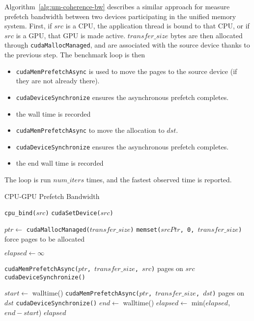 Algorithm~\ref{alg:um-coherence-bw} describes a similar approach for measure prefetch bandwidth between two devices participating in the unified memory system.
First, if $src$ is a CPU, the application thread is bound to that CPU, or if $src$ is a GPU, that GPU is made active.
$transfer\_size$ bytes are then allocated through \texttt{cudaMallocManaged}, and are associated with the source device thanks to the previous step.
The benchmark loop is then
\begin{itemize}
	\item \texttt{cudaMemPrefetchAsync} is used to move the pages to the source device (if they are not already there).
	\item \texttt{cudaDeviceSynchronize} ensures the asynchronous prefetch completes.
	\item the wall time is recorded
	\item \texttt{cudaMemPrefetchAsync} to move the allocation to $dst$.
	\item \texttt{cudaDeviceSynchronize} ensures the asynchronous prefetch completes.
	\item the end wall time is recorded
\end{itemize}
The loop is run $num\_iters$ times, and the fastest observed time is reported.

\begin{algorithm}
	\caption{CPU-GPU Prefetch Bandwidth}
	\label{alg:um-prefetch-bw}
	\begin{algorithmic}[1]
		\Statex
				
		\State \texttt{cpu\_bind($src$)}
		\Else
		\State \texttt{cudaSetDevice($src$)}
		\EndIf
				
		\State $ptr \gets$ \texttt{cudaMallocManaged($transfer\_size$)}
		\State \texttt{memset($srcPtr$, 0, $transfer\_size$)} \Comment force pages to be allocated
				
		\State $elapsed \gets \infty$
				
		\State \texttt{cudaMemPrefetchAsync($ptr$, $transfer\_size$, $src$)} \Comment pages on $src$
		\State \texttt{cudaDeviceSynchronize()}
				
		\State $start \gets$ walltime()
		\State \texttt{cudaMemPrefetchAsync($ptr$, $transfer\_size$, $dst$)} \Comment pages on $dst$
		\State \texttt{cudaDeviceSynchronize()}
		\State $end \gets$ walltime()
		\State $elapsed \gets$ min($elapsed$, $end-start$)
		\EndFor
		\State \Return $elapsed$
		\EndFunction
				
	\end{algorithmic}
\end{algorithm}

